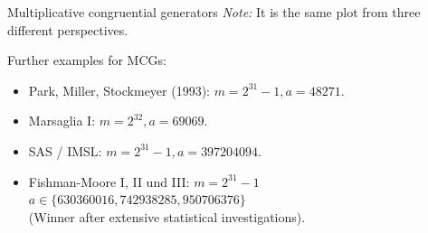 \begin{vbframe}{Multiplicative congruential generators}
{\footnotesize \emph{Note:} It is the same plot from three different perspectives.}

\framebreak

Further examples for MCGs:
\begin{itemize}
 \item Park, Miller, Stockmeyer (1993):  $m = 2^{31} - 1, a = 48271$.
 \item Marsaglia I:  $m = 2^{32}, a = 69069$.
 \item SAS / IMSL:  $m = 2^{31} - 1, a = 397204094$.
 \item Fishman-Moore I, II und III:   $m = 2^{31} - 1$\\
 $a \in \{630360016, 742938285, 950706376 \}$ \\
 (Winner after extensive statistical investigations).
\end{itemize}
\end{vbframe}


\endlecture

